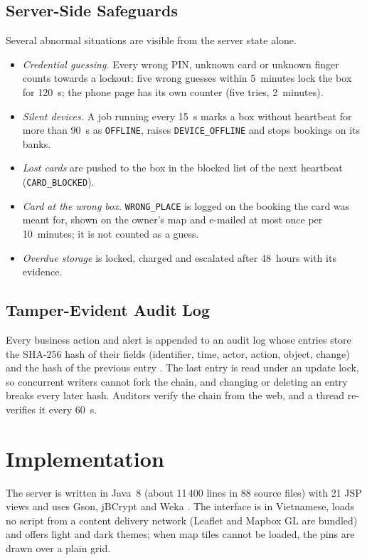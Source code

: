\subsection{Server-Side Safeguards}

Several abnormal situations are visible from the server state alone.
\begin{itemize}
  \item \textit{Credential guessing.} Every wrong PIN, unknown card or unknown finger counts towards a lockout: five
        wrong guesses within 5~minutes lock the box for 120~s; the phone page has its own counter (five tries,
        2~minutes).
  \item \textit{Silent devices.} A job running every 15~s marks a box without heartbeat for more than 90~s as
        \texttt{OFFLINE}, raises \texttt{DEVICE\_OFFLINE} and stops bookings on its banks.
  \item \textit{Lost cards} are pushed to the box in the blocked list of the next heartbeat (\texttt{CARD\_BLOCKED}).
  \item \textit{Card at the wrong box.} \texttt{WRONG\_PLACE} is logged on the booking the card was meant for, shown
        on the owner's map and e-mailed at most once per 10~minutes; it is not counted as a guess.
  \item \textit{Overdue storage} is locked, charged and escalated after 48~hours with its evidence.
\end{itemize}

\subsection{Tamper-Evident Audit Log}

Every business action and alert is appended to an audit log whose entries store the SHA-256 hash of their fields
(identifier, time, actor, action, object, change) and the hash of the previous entry \cite{haber1991timestamp}. The
last entry is read under an update lock, so concurrent writers cannot fork the chain, and changing or deleting an entry
breaks every later hash. Auditors verify the chain from the web, and a thread re-verifies it every 60~s.

\section{Implementation}\label{sec:impl}

The server is written in Java~8 (about 11\,400 lines in 88 source files) with 21 JSP views and uses Gson,
jBCrypt \cite{provos1999bcrypt} and Weka \cite{hall2009weka}. The interface is in Vietnamese, loads no script from a
content delivery network (Leaflet and Mapbox GL are bundled) and offers light and dark themes; when map tiles cannot be
loaded, the pins are drawn over a plain grid.

